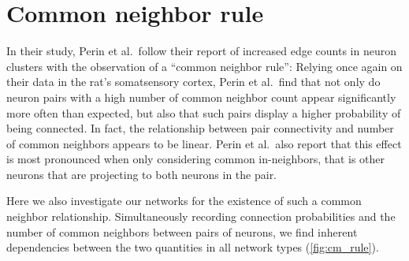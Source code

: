 
\section{Common neighbor rule}


In their study, Perin et al.\ follow their report of increased edge
counts in neuron clusters with the observation of a \enquote{common
  neighbor rule}: Relying once again on
their data in the rat's somatsensory cortex, Perin et al.\ find that
not only do neuron pairs with a high number of common neighbor count
 appear
significantly more often than expected, but also that such pairs
display a higher probability of being connected. In fact, the
relationship between pair connectivity and number of common neighbors
appears to be linear. Perin et al.\ also report that this effect is
most pronounced when only considering common in-neighbors, that is
other neurons that are projecting to both neurons in the pair.

Here we also investigate our networks for the existence of such a
common neighbor relationship. Simultaneously recording connection
probabilities and the number of common neighbors between pairs of
neurons, we find inherent dependencies between the two quantities in
all network types (\autoref{fig:cm_rule}). 

